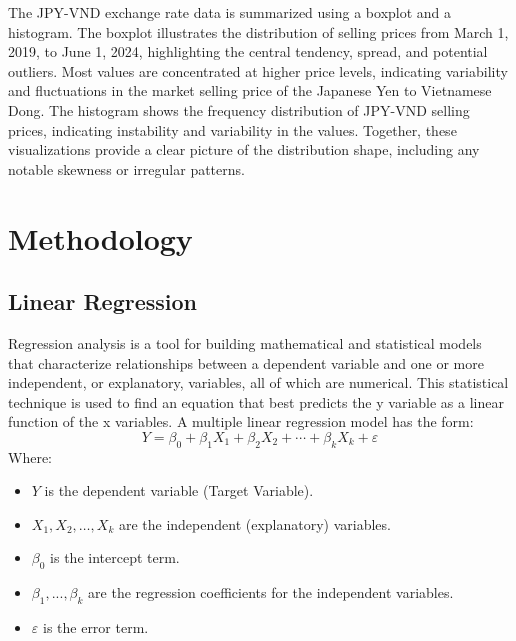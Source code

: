 \documentclass{ieeeojies}
\begin{document}
\justify
The JPY-VND exchange rate data is summarized using a boxplot and a histogram. The boxplot illustrates the distribution of selling prices from March 1, 2019, to June 1, 2024, highlighting the central tendency, spread, and potential outliers. Most values are concentrated at higher price levels, indicating variability and fluctuations in the market selling price of the Japanese Yen to Vietnamese Dong. The histogram shows the frequency distribution of JPY-VND selling prices, indicating instability and variability in the values. Together, these visualizations provide a clear picture of the distribution shape, including any notable skewness or irregular patterns.

\section{Methodology}
\subsection{Linear Regression}
Regression analysis is a tool for building mathematical and statistical models that characterize relationships between a dependent variable and one or more independent, or explanatory, variables, all of which are numerical. This statistical technique is used to find an equation that best predicts the y variable as a linear function of the x variables.
A multiple linear regression model has the form: 
\[Y=\beta_0+\beta_1X_1+\beta_2X_2+\cdots+\beta_kX_k+\varepsilon\]
Where:
\begin{itemize}
	\item $Y$ is the dependent variable (Target Variable).
	\item $X_1, X_2, \ldots, X_k$ are the independent (explanatory) variables.
	\item $\beta_0$ is the intercept term.
	\item $\beta_1,..., \beta_k$ are the regression coefficients for the independent variables.
	\item $\varepsilon$ is the error term. \cite{linear}
 \end{itemize}
\end{document}
